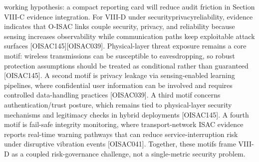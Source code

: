 \markdownRendererUlItem working hypothesis: a compact reporting card will reduce audit friction in Section VIII-C evidence integration.\markdownRendererUlItemEnd 
\markdownRendererUlEndTight \markdownRendererInterblockSeparator
{}
\markdownRendererSectionEnd 
\markdownRendererSectionEnd \markdownRendererSectionBegin
{}\markdownRendererInterblockSeparator
{}\markdownRendererSectionBegin
{}\markdownRendererInterblockSeparator
{}For VIII-D under security\markdownRendererUnderscore{}privacy\markdownRendererUnderscore{}reliability, evidence indicates that O-ISAC links couple security, privacy, and reliability because sensing increases observability while communication paths keep exploitable attack surfaces [O\markdownRendererUnderscore{}ISAC\markdownRendererUnderscore{}145][O\markdownRendererUnderscore{}ISAC\markdownRendererUnderscore{}039]. Physical-layer threat exposure remains a core motif: wireless transmissions can be susceptible to eavesdropping, so robust protection assumptions should be treated as conditional rather than guaranteed [O\markdownRendererUnderscore{}ISAC\markdownRendererUnderscore{}145]. A second motif is privacy leakage via sensing-enabled learning pipelines, where confidential user information can be involved and requires controlled data-handling practices [O\markdownRendererUnderscore{}ISAC\markdownRendererUnderscore{}039]. A third motif concerns authentication/trust posture, which remains tied to physical-layer security mechanisms and legitimacy checks in hybrid deployments [O\markdownRendererUnderscore{}ISAC\markdownRendererUnderscore{}145]. A fourth motif is fail-safe integrity monitoring, where transport-network ISAC evidence reports real-time warning pathways that can reduce service-interruption risk under disruptive vibration events [O\markdownRendererUnderscore{}ISAC\markdownRendererUnderscore{}041]. Together, these motifs frame VIII-D as a coupled risk-governance challenge, not a single-metric security problem.\markdownRendererInterblockSeparator
{}
\markdownRendererSectionEnd \markdownRendererSectionBegin
{}\markdownRendererInterblockSeparator
